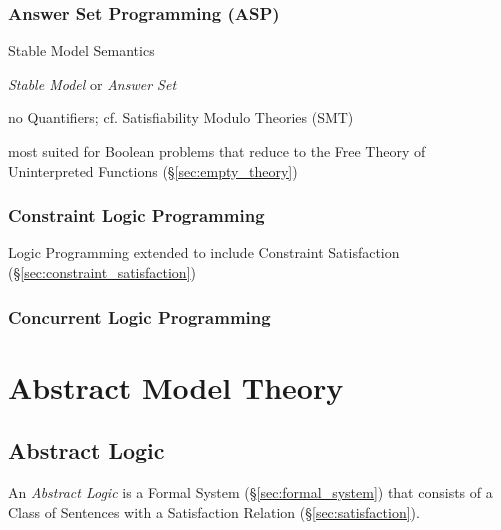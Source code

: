 \subsubsection{Answer Set Programming (ASP)}\label{sec:asp}

Stable Model Semantics

\emph{Stable Model} or \emph{Answer Set}

no Quantifiers; cf. Satisfiability Modulo Theories (SMT)

most suited for Boolean problems that reduce to the Free Theory of
Uninterpreted Functions (\S\ref{sec:empty_theory})



\subsubsection{Constraint Logic Programming}
\label{sec:constraint_logic_programming}

Logic Programming extended to include Constraint Satisfaction
(\S\ref{sec:constraint_satisfaction})



\subsubsection{Concurrent Logic Programming}
\label{sec:concurrent_logic_programming}



\section{Abstract Model Theory}\label{sec:abstract_model}

\subsection{Abstract Logic}\label{sec:abstract_logic}

An \emph{Abstract Logic} is a Formal System
(\S\ref{sec:formal_system}) that consists of a Class of Sentences with
a Satisfaction Relation (\S\ref{sec:satisfaction}).



